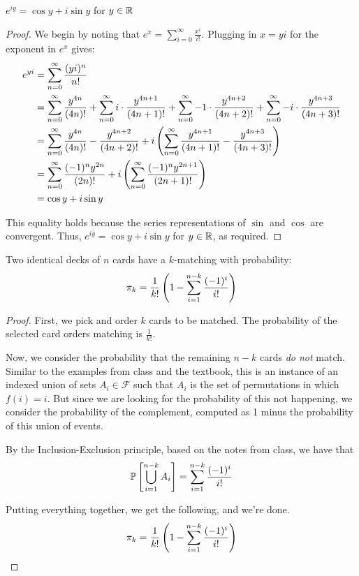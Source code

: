 \documentclass[name=Jacob\ Strieb, andrewid=jstrieb, course=69-420, num=8]{homework}
\begin{document}
\begin{claim}
    $e^{iy} = \cos y + i \sin y$ for $y \in \R$
\end{claim}
\begin{proof}
    We begin by noting that $e^x = \sum_{i = 0}^\infty \frac{x^i}{i!}$. Plugging in $x = yi$ for the exponent in $e^x$ gives:
    \begin{align*}
    e^{yi} &= \sum_{n = 0}^\infty \frac{(yi)^n}{n!} \\
    &= \sum_{n = 0}^\infty \frac{y^{4n}}{(4n)!} + \sum_{n = 0}^\infty i \cdot \frac{y^{4n + 1}}{(4n + 1)!} + \sum_{n = 0}^\infty -1 \cdot \frac{y^{4n + 2}}{(4n + 2)!} + \sum_{n = 0}^\infty -i \cdot \frac{y^{4n + 3}}{(4n + 3)!} \\
    &= \sum_{n = 0}^\infty \frac{y^{4n}}{(4n)!} - \frac{y^{4n + 2}}{(4n + 2)!} + i \lrp{ \sum_{n = 0}^\infty \frac{y^{4n + 1}}{(4n + 1)!} - \frac{y^{4n + 3}}{(4n + 3)!} } \\
    &= \sum_{n = 0}^\infty \frac{(-1)^n y^{2n}}{(2n)!} + i \lrp{\sum_{n = 0}^\infty \frac{(-1)^n y^{2n + 1}}{(2n + 1)!}} \\
    &= \cos y + i \sin y
    \end{align*} 
    
    This equality holds because the series representations of $\sin$ and $\cos$ are convergent. Thus, $e^{iy} = \cos y + i \sin y$ for $y \in \R$, as required.
\end{proof}
\newpage


\begin{claim}
    Two identical decks of $n$ cards have a $k$-matching with probability:
    $$ \pi_k = \frac1{k!} \lrp{ 1 - \sum_{i = 1}^{n - k} \frac{(-1)^i}{i!} } $$
\end{claim}
\begin{proof}
    First, we pick and order $k$ cards to be matched. The probability of the selected card orders matching is $\frac{1}{k!}$.
    
    Now, we consider the probability that the remaining $n - k$ cards \textit{do not} match. Similar to the examples from class and the textbook, this is an instance of an indexed union of sets $A_i \in \mathcal{F}$ such that $A_i$ is the set of permutations in which $f(i) = i$. But since we are looking for the probability of this not happening, we consider the probability of the complement, computed as 1 minus the probability of this union of events.
    
    By the Inclusion-Exclusion principle, based on the notes from class, we have that
    $$ \P{ \bigcup_{i = 1}^{n - k} A_i } = \sum_{i = 1}^{n - k} \frac{(-1)^i}{i!} $$
    
    Putting everything together, we get the following, and we're done.
    $$ \pi_k = \frac1{k!} \lrp{ 1 - \sum_{i = 1}^{n - k} \frac{(-1)^i}{i!} }$$
\end{proof}
\end{document}
